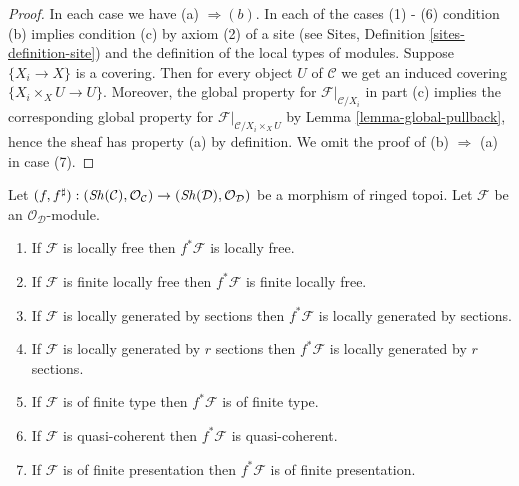\begin{proof}
In each case we have (a) $\Rightarrow (b)$. In each of the cases (1) - (6)
condition (b) implies condition (c) by axiom (2) of a site
(see Sites, Definition \ref{sites-definition-site})
and the definition of the local types of modules.
Suppose $\{X_i \to X\}$ is a covering.
Then for every object $U$ of $\mathcal{C}$ we get an
induced covering $\{X_i \times_X U \to U\}$. Moreover, the global
property for $\mathcal{F}|_{\mathcal{C}/X_i}$ in part (c) implies
the corresponding global property for
$\mathcal{F}|_{\mathcal{C}/X_i \times_X U}$ by
Lemma \ref{lemma-global-pullback}, hence the sheaf has property (a)
by definition. We omit the proof of (b) $\Rightarrow$ (a) in case (7).
\end{proof}

\begin{lemma}
\label{lemma-local-pullback}
Let
$(f, f^\sharp) :
(\mathop{\mathit{Sh}}\nolimits(\mathcal{C}), \mathcal{O}_\mathcal{C})
\to
(\mathop{\mathit{Sh}}\nolimits(\mathcal{D}), \mathcal{O}_\mathcal{D})$
be a morphism of ringed topoi.
Let $\mathcal{F}$ be an $\mathcal{O}_\mathcal{D}$-module.
\begin{enumerate}
\item If $\mathcal{F}$ is locally free then $f^*\mathcal{F}$ is locally free.
\item If $\mathcal{F}$ is finite locally free then $f^*\mathcal{F}$ is
finite locally free.
\item If $\mathcal{F}$ is locally generated by sections
then $f^*\mathcal{F}$ is locally generated by sections.
\item If $\mathcal{F}$ is locally generated by $r$ sections
then $f^*\mathcal{F}$ is locally generated by $r$ sections.
\item If $\mathcal{F}$ is of finite type
then $f^*\mathcal{F}$ is of finite type.
\item If $\mathcal{F}$ is quasi-coherent then
$f^*\mathcal{F}$ is quasi-coherent.
\item If $\mathcal{F}$ is of finite presentation
then $f^*\mathcal{F}$ is of finite presentation.
\end{enumerate}
\end{lemma}

